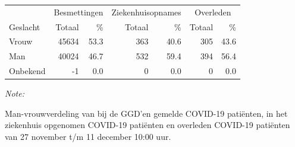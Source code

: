 \documentclass[
  english,
  man,floatsintext]{apa6}
\begin{document}
\begin{table}[H]
\centering\begingroup\fontsize{11}{13}\selectfont

\begin{threeparttable}
\begin{tabular}{lrrrrrr}
\toprule
\multicolumn{1}{c}{ } & \multicolumn{2}{c}{Besmettingen} & \multicolumn{2}{c}{Ziekenhuisopnames} & \multicolumn{2}{c}{Overleden} \\
\cmidrule(l{3pt}r{3pt}){2-3} \cmidrule(l{3pt}r{3pt}){4-5} \cmidrule(l{3pt}r{3pt}){6-7}
Geslacht & Totaal & \% & Totaal & \% & Totaal & \%\\
\midrule
Vrouw & 45634 & 53.3 & 363 & 40.6 & 305 & 43.6\\
Man & 40024 & 46.7 & 532 & 59.4 & 394 & 56.4\\
Onbekend & -1 & 0.0 & 0 & 0.0 & 0 & 0.0\\
\bottomrule
\end{tabular}
\begin{tablenotes}
\item \textit{Note: } 
\item Man-vrouwverdeling van bij de GGD’en gemelde COVID-19 patiënten, in het ziekenhuis opgenomen COVID-19 patiënten en overleden COVID-19 patiënten van 27 november t/m 11 december 10:00 uur.
\end{tablenotes}
\end{threeparttable}
\endgroup{}
\end{table}
\newpage
\end{document}
